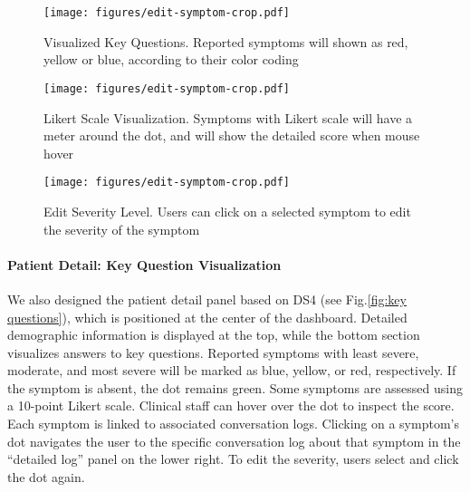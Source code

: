 \begin{figure*}[t]
    \centering
    \begin{subfigure}[t]{.3\linewidth}
        \centering
        \texttt{[image: figures/edit-symptom-crop.pdf]}
        \caption{Visualized Key Questions. Reported symptoms will shown as red, yellow or blue, according to their color coding}
    \end{subfigure}
    \hspace{.03\linewidth}
    \begin{subfigure}[t]{.3\linewidth}
        \centering
        \texttt{[image: figures/edit-symptom-crop.pdf]}
        \caption{Likert Scale Visualization. Symptoms with Likert scale will have a meter around the dot, and will show the detailed score when mouse hover}
    \end{subfigure}
    \hspace{.03\linewidth}
    \begin{subfigure}[t]{.3\linewidth}
        \centering
        \texttt{[image: figures/edit-symptom-crop.pdf]}
        \caption{Edit Severity Level. Users can click on a selected symptom to edit the severity of the symptom}
    \end{subfigure}
    \caption{Visualization of Key Questions: An example of the local interactions within each section.}
    \label{fig:key questions}
\end{figure*}

\paragraph{\textbf{Patient Detail: Key Question Visualization}}
We also designed the patient detail panel based on DS4 (see Fig.\ref{fig:key questions}), which is positioned at the center of the dashboard. Detailed demographic information is displayed at the top, while the bottom section visualizes answers to key questions. 
Reported symptoms with least severe, moderate, and most severe will be marked as blue, yellow, or red, respectively.
If the symptom is absent, the dot remains green. Some symptoms are assessed using a 10-point Likert scale. Clinical staff can hover over the dot to inspect the score. 
Each symptom is linked to associated conversation logs. 
Clicking on a symptom's dot navigates the user to the specific conversation log about that symptom in the ``detailed log'' panel on the lower right.
To edit the severity, users select and click the dot again.



